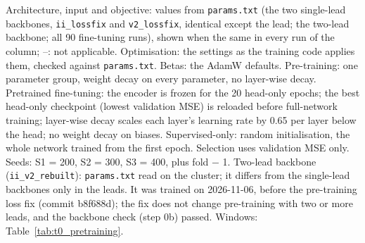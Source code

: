 \begin{table}[htbp]
\par\smallskip\footnotesize Architecture, input and objective: values from \texttt{params.txt} (the two single-lead backbones, \texttt{ii\_lossfix} and \texttt{v2\_lossfix}, identical except the lead; the two-lead backbone; all 90 fine-tuning runs), shown when the same in every run of the column; --: not applicable. Optimisation: the settings as the training code applies them, checked against \texttt{params.txt}. Betas: the AdamW defaults. Pre-training: one parameter group, weight decay on every parameter, no layer-wise decay. Pretrained fine-tuning: the encoder is frozen for the 20 head-only epochs; the best head-only checkpoint (lowest validation MSE) is reloaded before full-network training; layer-wise decay scales each layer's learning rate by 0.65 per layer below the head; no weight decay on biases. Supervised-only: random initialisation, the whole network trained from the first epoch. Selection uses validation MSE only. Seeds: S1 = 200, S2 = 300, S3 = 400, plus fold $-$ 1. Two-lead backbone (\texttt{ii\_v2\_rebuilt}): \texttt{params.txt} read on the cluster; it differs from the single-lead backbones only in the leads. It was trained on 2026-11-06, before the pre-training loss fix (commit b8f688d); the fix does not change pre-training with two or more leads, and the backbone check (step 0b) passed. Windows: Table~\ref{tab:t0_pretraining}.
\end{table}
